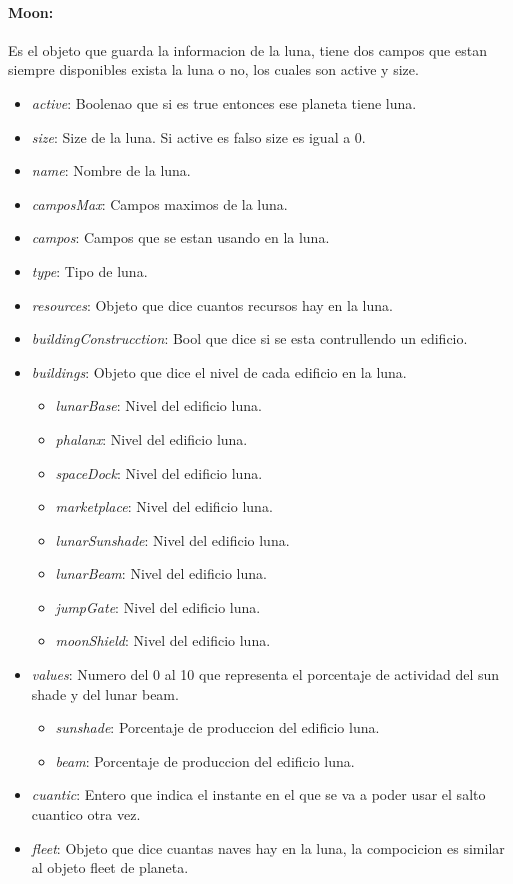 \documentclass{article}
\begin{document}
\paragraph{Moon:} Es el objeto que guarda la informacion de la luna, tiene dos campos que estan siempre disponibles exista la luna o no, los cuales son active y size.
\vspace{-5mm}
\begin{itemize}[noitemsep]
    \item \textit{active}: Boolenao que si es true entonces ese planeta tiene luna.
    \item \textit{size}: Size de la luna. Si active es falso size es igual a 0.
    \item \textit{name}: Nombre de la luna.
    \item \textit{camposMax}: Campos maximos de la luna.
    \item \textit{campos}: Campos que se estan usando en la luna.
    \item \textit{type}: Tipo de luna.
    \item \textit{resources}: Objeto que dice cuantos recursos hay en la luna.
    \item \textit{buildingConstrucction}: Bool que dice si se esta contrullendo un edificio.
    \item \textit{buildings}: Objeto que dice el nivel de cada edificio en la luna.
    \begin{itemize}[noitemsep]
        \item \textit{lunarBase}: Nivel del edificio luna.
        \item \textit{phalanx}: Nivel del edificio luna.
        \item \textit{spaceDock}: Nivel del edificio luna.
        \item \textit{marketplace}: Nivel del edificio luna.
        \item \textit{lunarSunshade}: Nivel del edificio luna.
        \item \textit{lunarBeam}: Nivel del edificio luna.
        \item \textit{jumpGate}: Nivel del edificio luna.
        \item \textit{moonShield}: Nivel del edificio luna.
    \end{itemize}
    \item \textit{values}: Numero del 0 al 10 que representa el porcentaje de actividad del sun shade y del lunar beam.
    \begin{itemize}[noitemsep]
        \item \textit{sunshade}: Porcentaje de produccion del edificio luna.
        \item \textit{beam}: Porcentaje de produccion del edificio luna.
    \end{itemize}
    \item \textit{cuantic}: Entero que indica el instante en el que se va a poder usar el salto cuantico otra vez.
    \item \textit{fleet}: Objeto que dice cuantas naves hay en la luna, la compocicion es similar al objeto fleet de planeta.
\end{itemize}
\end{document}
